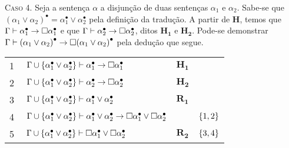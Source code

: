 \begin{tcolorbox}[enhanced jigsaw, breakable, sharp corners, colframe=black, colback=white, boxrule=0.5pt, left=1.5mm, right=1.5mm, top=1.5mm, bottom=1.5mm]
            \vspace{.5\baselineskip}
            \textsc{Caso 4.}
            Seja a sentença $\alpha$ a disjunção de duas sentenças $\alpha_1$ e $\alpha_2$.
            Sabe-se que ${(\alpha_1\vee\alpha_2)}^\bullet=\alpha_1^\bullet\vee\alpha_2^\bullet$ pela definição da tradução.
            A partir de $\mathbf{H}$, temos que $\Gamma\mathrel{\vdash}\alpha_1^\bullet\to\Box\alpha_1^\bullet$ e que $\Gamma\mathrel{\vdash}\alpha_2^\bullet\to\Box\alpha_2^\bullet$, ditos $\mathbf{H_1}$ e $\mathbf{H_2}$.
            Pode-se demonstrar $\Gamma\vdash{(\alpha_1\vee\alpha_2)}^\bullet\to\Box{(\alpha_1\vee\alpha_2)}^\bullet$ pela dedução que segue.

            \vspace{.5\baselineskip}
            \footnotesize
            \setlength{\rowskip}{.5\baselineskip}
            \begin{xltabular}{\textwidth}{r | X l l}
                \scriptsize{\phantom{1}1}\phantom{ } & $\ \Gamma\cup\set{\alpha_1^\bullet\vee\alpha_2^\bullet}\entails\alpha_1^\bullet\to\nec\alpha_1^\bullet$                                                                 & $\mathbf{H_1}$\phantom{1}                & \\[\rowskip]
                \scriptsize{\phantom{1}2}\phantom{ } & $\ \Gamma\cup\set{\alpha_1^\bullet\vee\alpha_2^\bullet}\entails\alpha_2^\bullet\to\nec\alpha_2^\bullet$                                                                 & $\mathbf{H_2}$                                  & \\[\rowskip]\pagebreak[4]
                \scriptsize{\phantom{1}3}\phantom{ } & $\ \Gamma\cup\set{\alpha_1^\bullet\vee\alpha_2^\bullet}\entails\alpha_1^\bullet\vee\alpha_2^\bullet$                                                                    & $\hyperref[modal.rule.1]{\mathbf{R_1}}$         & \\[\rowskip]
                \scriptsize{\phantom{1}4}\phantom{ } & $\ \Gamma\cup\set{\alpha_1^\bullet\vee\alpha_2^\bullet}\entails\alpha_1^\bullet\vee\alpha_2^\bullet\to\nec\alpha_1^\bullet\vee\nec\alpha_2^\bullet$           &                  & $\left\{1, 2\right\}$\\[\rowskip]
                \scriptsize{\phantom{1}5}\phantom{ } & $\ \Gamma\cup\set{\alpha_1^\bullet\vee\alpha_2^\bullet}\entails\nec\alpha_1^\bullet\vee\nec\alpha_2^\bullet$                                                            & $\hyperref[modal.rule.2]{\mathbf{R_2}}$         & $\left\{3,4\right\}$\\[\rowskip]

\end{xltabular}
\end{tcolorbox}
